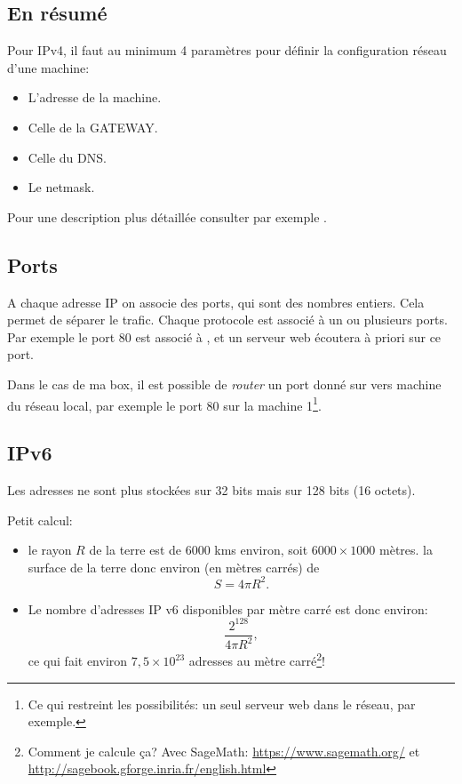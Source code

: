 \subsection{En résumé}
Pour IPv4, il faut au minimum  4 paramètres pour définir la
configuration réseau d'une machine:
\begin{itemize}
\item L'adresse de la machine.
\item Celle de la GATEWAY.
\item Celle du DNS.
\item Le netmask.
\end{itemize}
Pour une description plus détaillée consulter par exemple \cite{dns}.
\subsection{Ports} A chaque adresse IP on associe des ports, qui sont
des nombres entiers. Cela permet de séparer le trafic. Chaque protocole
est associé à un ou plusieurs ports. Par exemple le port 80 est
associé à , et un serveur web écoutera à priori sur ce port.

Dans le cas de ma box, il est possible de \emph{router} un port donné
sur vers machine du réseau local, par exemple le port 80 sur la
machine 1\footnote{Ce qui restreint les possibilités: un seul serveur
  web  dans le réseau, par exemple.}.

\subsection{IPv6}
  Les adresses ne sont plus stockées sur 32 bits mais sur 128 bits (16
  octets).

  Petit calcul:

  \begin{itemize}
    \item le rayon $R$ de la terre est de 6000 kms environ, soit $6000
      \times 1000$ mètres. la surface de la terre donc environ (en
      mètres carrés) de
      $$S= 4 \pi R^2.$$
    \item Le nombre d'adresses IP v6 disponibles par mètre carré est
      donc environ:
      $$\frac{2^{128} }{4 \pi R^2},$$
      ce qui fait environ $7,5\times  10^{23}$ adresses au mètre
          carré\footnote{Comment je calcule ça? Avec SageMath:
            \url{https://www.sagemath.org/} et
            \url{http://sagebook.gforge.inria.fr/english.html}}!
  \end{itemize}


